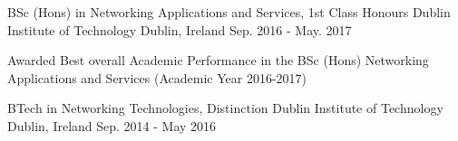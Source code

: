 

\begin{cventries}

  \cventry
    {BSc (Hons) in Networking Applications and Services, 1st Class Honours} %
    {Dublin Institute of Technology } %
    {Dublin, Ireland} %
    {Sep. 2016 - May. 2017} %
    {
      \begin{cvitems} %
        \item {Awarded Best overall Academic Performance in the BSc (Hons) Networking Applications and Services 
        (Academic Year 2016-2017)}
      \end{cvitems}
    }
    
  \cventry
    {BTech in Networking Technologies, Distinction} %
    {Dublin Institute of Technology } %
    {Dublin, Ireland} %
    {Sep. 2014 - May 2016} %
\end{cventries}
